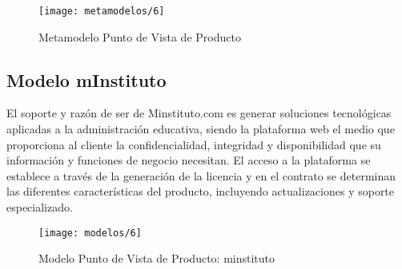   \begin{figure}[H]
	\centering
	\texttt{[image: metamodelos/6]}
	\captionsetup{width=.95\textwidth}
	\caption{Metamodelo Punto de Vista de Producto \cite{ref9}}
	\label{metamodelo6}
  \end{figure}

  \subsection{Modelo mInstituto}
  El soporte y razón de ser de Minstituto.com es generar soluciones tecnológicas aplicadas a la administración educativa, siendo la plataforma web el medio que proporciona al cliente la confidencialidad, integridad y disponibilidad que su información y funciones de negocio necesitan.  El acceso a la plataforma se establece a través de la generación de la licencia y en el contrato se determinan las diferentes características del producto, incluyendo actualizaciones y soporte especializado.

  \begin{figure}[H]
	\centering
	\texttt{[image: modelos/6]}
	\captionsetup{width=.95\textwidth}
	\caption{Modelo Punto de Vista de Producto: minstituto}
	\label{modelo6}
  \end{figure}